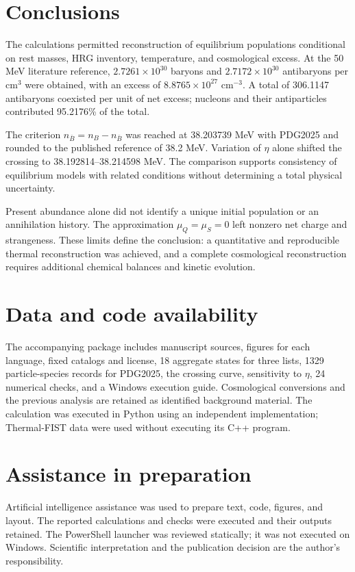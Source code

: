 \section{Conclusions}
The calculations permitted reconstruction of equilibrium populations conditional on rest masses, HRG inventory, temperature, and cosmological excess. At the 50 MeV literature reference, $2.7261\times10^{30}$ baryons and $2.7172\times10^{30}$ antibaryons per cm$^3$ were obtained, with an excess of $8.8765\times10^{27}$ cm$^{-3}$. A total of 306.1147 antibaryons coexisted per unit of net excess; nucleons and their antiparticles contributed 95.2176\% of the total.

The criterion $n_{\bar B}=n_B-n_{\bar B}$ was reached at 38.203739 MeV with PDG2025 and rounded to the published reference of 38.2 MeV. Variation of $\eta$ alone shifted the crossing to 38.192814--38.214598 MeV. The comparison supports consistency of equilibrium models with related conditions without determining a total physical uncertainty.

Present abundance alone did not identify a unique initial population or an annihilation history. The approximation $\mu_Q=\mu_S=0$ left nonzero net charge and strangeness. These limits define the conclusion: a quantitative and reproducible thermal reconstruction was achieved, and a complete cosmological reconstruction requires additional chemical balances and kinetic evolution.

\section*{Data and code availability}
The accompanying package includes manuscript sources, figures for each language, fixed catalogs and license, 18 aggregate states for three lists, 1329 particle-species records for PDG2025, the crossing curve, sensitivity to $\eta$, 24 numerical checks, and a Windows execution guide. Cosmological conversions and the previous analysis are retained as identified background material. The calculation was executed in Python using an independent implementation; Thermal-FIST data were used without executing its C++ program.

\section*{Assistance in preparation}
Artificial intelligence assistance was used to prepare text, code, figures, and layout. The reported calculations and checks were executed and their outputs retained. The PowerShell launcher was reviewed statically; it was not executed on Windows. Scientific interpretation and the publication decision are the author's responsibility.
